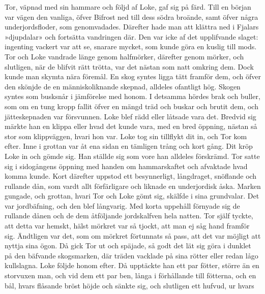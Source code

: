 Tor, väpnad med sin hammare och följd af Loke, gaf sig på färd. Till en
början var vägen den vanliga, öfver Bifrost ned till dess södra broände,
samt öfver några underjordsfloder, som genomvadades. Därefter hade man
att klättra ned i Fjalars »djupdalar» och fortsätta vandringen där. Den
var icke af det upplifvande slaget: ingenting vackert var att se,
snarare mycket, som kunde göra en kuslig till mods. Tor och Loke
vandrade länge genom halfmörker, därefter genom mörker, och slutligen,
när de blifvit rätt trötta, var det nästan som natt omkring dem. Dock
kunde man skymta
\protect\hypertarget{lb1625905.xhtmlux5cux23start41}{}{}\protect\hypertarget{lb1625905.xhtmlux5cux23start41-a}{}{}\protect\hypertarget{lb1625905.xhtmlux5cux23start41-b}{}{}\protect\hypertarget{lb1625905.xhtmlux5cux23start41-c}{}{}\protect\hypertarget{lb1625905.xhtmlux5cux23start41-d}{}{}
nära föremål. En skog syntes ligga tätt framför dem, och öfver den
skönjde de en människoliknande skepnad, alldeles ofantligt hög. Skogen
syntes som busksnår i jämförelse med honom. I detsamma hördes brak och
buller, som om en tung kropp fallit öfver en mängd träd och buskar och
brutit dem, och jätteskepnaden var försvunnen. Loke blef rädd eller
låtsade vara det. Bredvid sig märkte han en klippa eller hvad det kunde
vara, med en bred öppning, nästan så stor som klippväggen, hvari hon
var. Loke tog sin tillflykt dit in, och Tor kom efter. Inne i grottan
var åt ena sidan en tämligen trång och kort gång. Dit kröp Loke in och
gömde sig. Han ställde sig som vore han alldeles förskrämd. Tor satte
sig i sidogångens öppning med handen om hammarskaftet och afvaktade hvad
komma kunde. Kort därefter uppstod ett besynnerligt, långdraget,
snöflande och rullande dån, som vardt allt förfärligare och liknade en
underjordisk åska. Marken gungade, och grottan, hvari Tor och Loke gömt
sig, skälfde i sina grundvalar. Det var jordbäfning, och den blef
långvarig. Med korta uppehåll förnyade sig de rullande dånen och de dem
åtföljande jordskalfven hela natten. Tor själf tyckte, att detta var
hemskt, hälst mörkret var så tjockt, att man ej såg hand framför sig.
Ändtligen var det, som om mörkret förtunnats så pass, att det var
möjligt att nyttja sina ögon. Då gick Tor ut och späjade, så godt det
lät sig göra i dunklet på den bäfvande skogsmarken, där träden vacklade
på sina rötter eller redan lågo kullslagna. Loke följde honom efter. Då
upptäckte han ett par fötter, större än en storvuxen man, och vid dem
ett par ben, långa i förhållande till fötterna, och en bål, hvars
flåsande bröst höjde och sänkte sig, och slutligen ett hufvud, ur hvars
